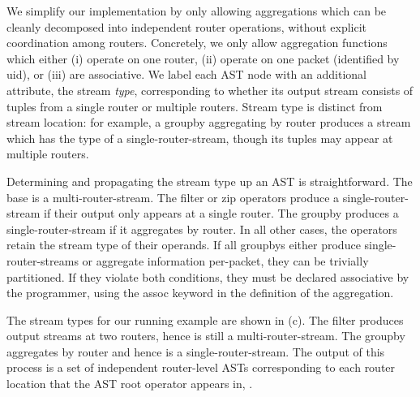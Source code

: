 We simplify our implementation by only allowing aggregations which can be
cleanly decomposed into independent router operations, without explicit
coordination among routers.
Concretely, we only allow aggregation functions which either (i) operate on one
router, (ii) operate on one packet (identified by {\ct uid}), or (iii)
are associative.
We label each AST node with an additional attribute, the stream {\em type},
corresponding to whether its output stream consists of tuples from a single
router or multiple routers. Stream type is distinct from stream location: for
example, a {\ct groupby} aggregating by {\ct router} produces a stream which has
the type of a single-router-stream, though its tuples may appear at multiple
routers.

Determining and propagating the stream type up an AST is straightforward. The
base {\ct \pktlog} is a multi-router-stream. The {\ct filter} or {\ct zip}
operators produce a single-router-stream if their output only appears at a
single router. The {\ct groupby} produces a single-router-stream if it
aggregates by {\ct router.} In all other cases, the operators retain the stream
type of their operands. If all {\ct groupby}s either produce
single-router-streams or aggregate information per-packet, they can be trivially
partitioned. If they violate both conditions, they must be declared associative
by the programmer, using the {\ct assoc} keyword in the definition of the
aggregation.

The stream types for our running example are shown in
(c). The {\ct filter} produces output streams at
two routers, hence is still a multi-router-stream. The {\ct groupby} aggregates
by {\ct router} and hence is a single-router-stream. The output of this process
is a set of independent router-level ASTs corresponding to each router location
that the AST root operator appears in, .



